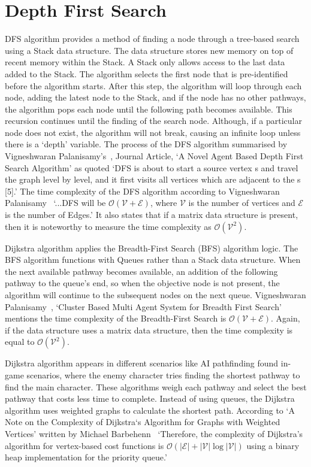 \documentclass[conference]{IEEEtran}
\begin{document}
    \section{Depth First Search}
      DFS algorithm provides a method of finding a node through a tree-based search using a Stack data structure. The data structure stores new memory on top of recent memory within the Stack. A Stack only allows access to the last data added to the Stack. The algorithm selects the first node that is pre-identified before the algorithm starts. After this step, the algorithm will loop through each node, adding the latest node to the Stack, and if the node has no other pathways, the algorithm pops each node until the following path becomes available. This recursion continues until the finding of the search node. Although, if a particular node does not exist, the algorithm will not break, causing an infinite loop unless there is a `depth' variable. The process of the DFS algorithm summarised by Vigneshwaran Palanisamy's~\cite{palanisamy_novel_2020}, Journal Article, `A Novel Agent Based Depth First Search Algorithm' as quoted `DFS is about to start a source vertex s and travel the graph level by level, and it first visits all vertices which are adjacent to the s [5].' The time complexity of the DFS algorithm according to Vigneshwaran Palanisamy~\cite{palanisamy_novel_2020} `...DFS will be $\mathcal{O}(\mathcal{V}+\mathcal{E})$, where $\mathcal{V}$ is the number of vertices and $\mathcal{E}$ is the number of Edges.' It also states that if a matrix data structure is present, then it is noteworthy to measure the time complexity as $\mathcal{O}(\mathcal{V}^2)$.
      
      Dijkstra algorithm applies the Breadth-First Search (BFS) algorithm logic. The BFS algorithm functions with Queues rather than a Stack data structure. When the next available pathway becomes available, an addition of the following pathway to the queue's end, so when the objective node is not present, the algorithm will continue to the subsequent nodes on the next queue. Vigneshwaran Palanisamy~\cite{palanisamy_cluster_2020}, `Cluster Based Multi Agent System for Breadth First Search' mentions the time complexity of the Breadth-First Search is $\mathcal{O}(\mathcal{V} + \mathcal{E})$. Again, if the data structure uses a matrix data structure, then the time complexity is equal to $\mathcal{O}(\mathcal{V}^2)$.
            
      Dijkstra algorithm appears in different scenarios like AI pathfinding found in-game scenarios, where the enemy character tries finding the shortest pathway to find the main character. These algorithms weigh each pathway and select the best pathway that costs less time to complete. Instead of using queues, the Dijkstra algorithm uses weighted graphs to calculate the shortest path. According to `A Note on the Complexity of Dijkstra`s Algorithm for Graphs with Weighted Vertices' written by Michael Barbehenn~\cite{barbehenn_note_1998} `Therefore, the complexity of Dijkstra’s algorithm for vertex-based cost functions is $\mathcal{O}(|\mathcal{E}| + |\mathcal{V}| \log |\mathcal{V}|)$ using a binary
      heap implementation for the priority queue.' 
\end{document}
